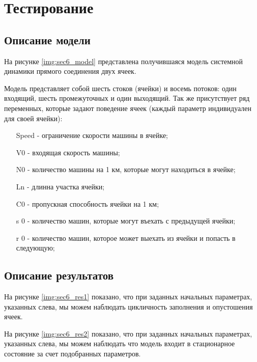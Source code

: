 \section{Тестирование}

\subsection{Описание модели}

На рисунке \ref{img:sec6_model} представлена получившаяся модель системной динамики прямого соединения двух ячеек.

Модель представляет собой шесть стоков (ячейки) и восемь потоков: один входящий, шесть промежуточных и один выходящий.
Так же присутствует ряд переменных, которые задают поведение ячеек (каждый параметр индивидуален для своей ячейки):
\begin{itemize}
    \item[Speed] - ограничение скорости машины в ячейке;
    \item[V0] - входящая скорость машины;
    \item[N0] - количество машины на 1 км, которые могут находиться в ячейке;
    \item[Ln] - длинна участка ячейки;
    \item[C0] - пропускная способность ячейки на 1 км;
    \item[s 0] - количество машин, которые могут въехать с предыдущей ячейки;
    \item[r 0] - количество машин, которое может выехать из ячейки и попасть в следующую;
\end{itemize}


\subsection{Описание результатов}

На рисунке \ref{img:sec6_res1} показано, что при заданных начальных параметрах, указанных слева, мы можем наблюдать цикличность заполнения и опустошения ячеек.


На рисунке \ref{img:sec6_res2} показано, что при заданных начальных параметрах, указанных слева, мы можем наблюдать что модель входит в стационарное состояние за счет подобранных параметров.

